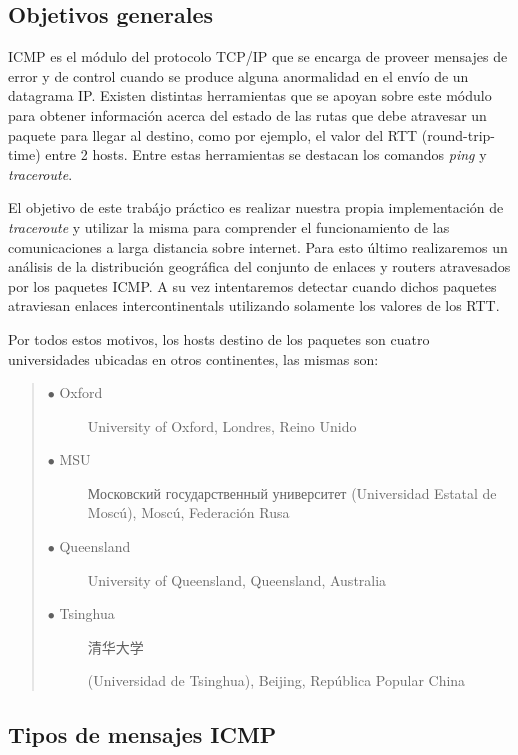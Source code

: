 \subsection{Objetivos generales}

ICMP es el m\'odulo del protocolo TCP/IP que se encarga de proveer mensajes de error y de control cuando
se produce alguna anormalidad en el env\'io de un datagrama IP. Existen distintas herramientas
que se apoyan sobre este m\'odulo para obtener informaci\'on acerca del estado de las rutas que
debe atravesar un paquete para llegar al destino, como por ejemplo, el valor del RTT (round-trip-time)
entre 2 hosts. Entre estas herramientas se destacan los comandos \emph{ping} y \emph{traceroute}.

El objetivo de este trab\'ajo pr\'actico es realizar nuestra propia
implementaci\'on de \emph{traceroute} y utilizar la misma para comprender el
funcionamiento de las comunicaciones a larga distancia sobre internet.
Para esto \'ultimo realizaremos un an\'alisis de la distribuci\'on
geogr\'afica del conjunto de enlaces y routers atravesados por los paquetes
ICMP.
A su vez intentaremos detectar cuando dichos paquetes atraviesan enlaces
intercontinentals utilizando solamente los valores de los RTT.

Por todos estos motivos, los hosts destino de los paquetes son cuatro universidades ubicadas en
otros continentes, las mismas son:

\begin{quote}
\begin{description}
	\item [$\bullet$ Oxford] {University of Oxford, Londres, Reino Unido}
	\item [$\bullet$ MSU] {\foreignlanguage{russian}{Московский государственный университет} (Universidad Estatal de Mosc\'u), Mosc\'u, Federaci\'on Rusa}
	\item [$\bullet$ Queensland] {University of Queensland, Queensland, Australia}
	\item [$\bullet$ Tsinghua] {\begin{CJK}{UTF8}{gbsn}清华大学\end{CJK} (Universidad de Tsinghua), Beijing, Rep\'ublica Popular China}
\end{description}
\end{quote}

\subsection{Tipos de mensajes ICMP}

